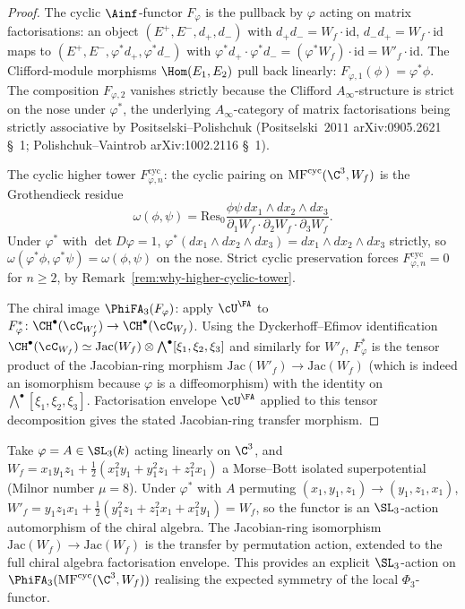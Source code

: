 \begin{proof}
The cyclic $\Ainf$-functor $F_\varphi$ is the pullback by
$\varphi$ acting on matrix factorisations: an object $(E^+, E^-, d_+, d_-)$
with $d_+ d_- = W_f \cdot \mathrm{id}$, $d_- d_+ = W_f \cdot \mathrm{id}$
maps to $(E^+, E^-, \varphi^* d_+, \varphi^* d_-)$ with $\varphi^* d_+
\cdot \varphi^* d_- = (\varphi^* W_f) \cdot \mathrm{id} = W'_f \cdot
\mathrm{id}$.  The Clifford-module morphisms $\Hom(E_1, E_2)$ pull
back linearly: $F_{\varphi, 1}(\phi) = \varphi^* \phi$.  The
composition $F_{\varphi, 2}$ vanishes strictly because the Clifford
$A_\infty$-structure is strict on the nose under $\varphi^*$, the
underlying $A_\infty$-category of matrix factorisations being
strictly associative by Positselski--Polishchuk (Positselski~$2011$
arXiv:0905.2621 \S~1; Polishchuk--Vaintrob arXiv:1002.2116 \S~1).

The cyclic higher tower $F_{\varphi, n}^{\mathrm{cyc}}$: the cyclic
pairing on $\mathrm{MF}^{\mathrm{cyc}}(\C^3, W_f)$ is the Grothendieck
residue
\[
  \omega(\phi, \psi)
  = \mathrm{Res}_0
  \frac{\phi \psi \, dx_1 \wedge dx_2 \wedge dx_3}
       {\partial_1 W_f \cdot \partial_2 W_f \cdot \partial_3 W_f}.
\]
Under $\varphi^*$ with $\det D\varphi = 1$,
$\varphi^*(dx_1 \wedge dx_2 \wedge dx_3) = dx_1 \wedge dx_2 \wedge dx_3$
strictly, so $\omega(\varphi^* \phi, \varphi^* \psi) = \omega(\phi, \psi)$
on the nose.  Strict cyclic preservation forces $F_{\varphi, n}^{\mathrm{cyc}}
= 0$ for $n \geq 2$, by
Remark~\ref{rem:why-higher-cyclic-tower}.

The chiral image $\PhiFA_3(F_\varphi)$: apply $\cU^\FA$ to
$F_\varphi^* \colon \CH^\bullet(\cC_{W'_f}) \to \CH^\bullet(\cC_{W_f})$.
Using the Dyckerhoff--Efimov identification
$\CH^\bullet(\cC_{W_f}) \simeq \mathrm{Jac}(W_f) \otimes \bigwedge^\bullet
[\xi_1, \xi_2, \xi_3]$ and similarly for $W'_f$, $F_\varphi^*$ is the
tensor product of the Jacobian-ring morphism $\mathrm{Jac}(W'_f)
\to \mathrm{Jac}(W_f)$ (which is indeed an isomorphism because
$\varphi$ is a diffeomorphism) with the identity on
$\bigwedge^\bullet[\xi_1, \xi_2, \xi_3]$.  Factorisation envelope
$\cU^\FA$ applied to this tensor decomposition gives the stated
Jacobian-ring transfer morphism.
\end{proof}

\begin{example}[$\C^3 \to \C^3$ linear with $\det = 1$]
\label{ex:c3-linear-diffeomorphism}
Take $\varphi = A \in \SL_3(k)$ acting linearly on $\C^3$, and $W_f =
x_1 y_1 z_1 + \tfrac{1}{2}(x_1^2 y_1 + y_1^2 z_1 + z_1^2 x_1)$ a
Morse--Bott isolated superpotential (Milnor number $\mu = 8$).
Under $\varphi^*$ with $A$ permuting $(x_1, y_1, z_1) \to
(y_1, z_1, x_1)$, $W'_f = y_1 z_1 x_1 + \tfrac{1}{2}(y_1^2 z_1 +
z_1^2 x_1 + x_1^2 y_1) = W_f$, so the functor is an $\SL_3$-action
automorphism of the chiral algebra.  The Jacobian-ring isomorphism
$\mathrm{Jac}(W_f) \to \mathrm{Jac}(W_f)$ is the transfer by
permutation action, extended to the full chiral algebra factorisation
envelope.  This provides an explicit $\SL_3$-action on
$\PhiFA_3(\mathrm{MF}^{\mathrm{cyc}}(\C^3, W_f))$ realising the
expected symmetry of the local $\Phi_3$-functor.
\end{example}

